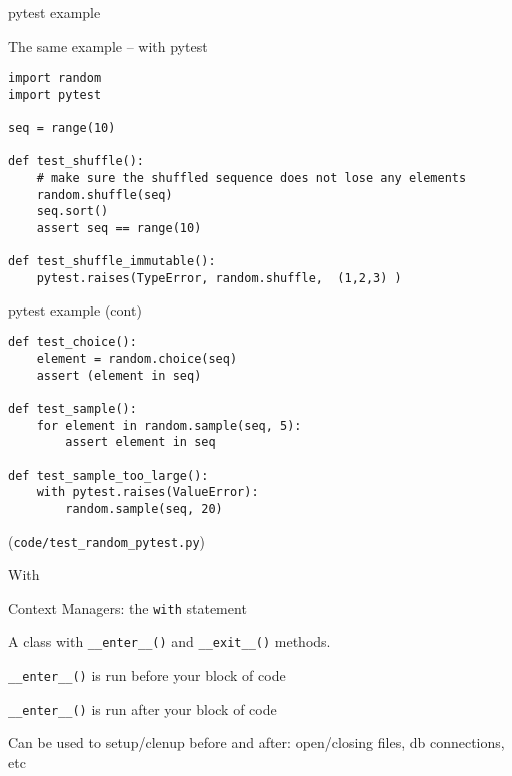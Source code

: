 \documentclass{beamer}
\begin{document}
\begin{frame}[fragile]{pytest example}

{\Large The same example -- with pytest}

{\small
\begin{verbatim}
import random
import pytest

seq = range(10)

def test_shuffle():
    # make sure the shuffled sequence does not lose any elements
    random.shuffle(seq)
    seq.sort()
    assert seq == range(10)

def test_shuffle_immutable():
    pytest.raises(TypeError, random.shuffle,  (1,2,3) )
\end{verbatim}
}

\end{frame} 

\begin{frame}[fragile]{pytest example (cont) }

{\small
\begin{verbatim}
def test_choice():
    element = random.choice(seq)
    assert (element in seq)

def test_sample():
    for element in random.sample(seq, 5):
        assert element in seq

def test_sample_too_large():
    with pytest.raises(ValueError):
        random.sample(seq, 20)
\end{verbatim}
}

\vfill
(\verb|code/test_random_pytest.py|)

\end{frame} 

\begin{frame}[fragile]{With}

{\LARGE Context Managers:} {\Large the \verb|with| statement}

\vfill
{\Large A class with \verb|__enter__()| and \verb|__exit__()| methods.}
 
\vfill
{\Large \verb|__enter__()| is run before your block of code}

\vfill
{\Large \verb|__enter__()| is run after your block of code}

\vfill
{\Large Can be used to setup/clenup before and after: open/closing files, db connections, etc}
\end{frame} 
\end{document}
